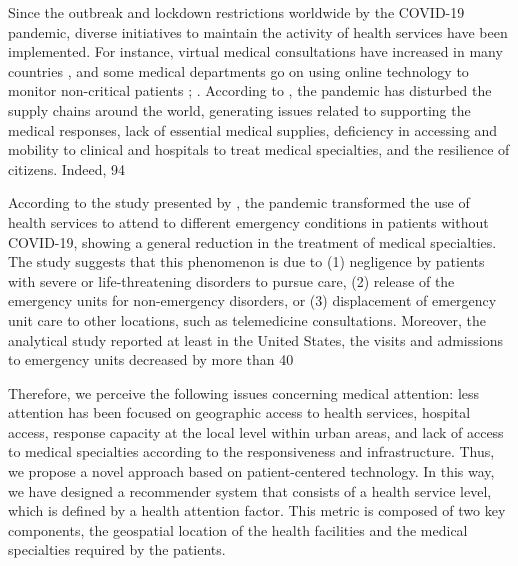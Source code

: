 \documentclass[sustainability,article,submit,pdftex,moreauthors]{Definitions/mdpi}
\begin{document}
Since the outbreak and lockdown restrictions worldwide by the COVID-19 pandemic, diverse initiatives to maintain the activity of health services have been implemented. For instance, virtual medical consultations have increased in many countries \citep{banerjee2020teleconsultation}, and some medical departments go on using online technology to monitor non-critical patients \citep{pinar2021preliminary}; \citep{tamayo2020evaluation}. According to \citep{shahed2021supply}, the pandemic has disturbed the supply chains around the world, generating issues related to supporting the medical responses, lack of essential medical supplies, deficiency in accessing and mobility to clinical and hospitals to treat medical specialties, and the resilience of citizens. Indeed, 94%

According to the study presented by \citep{rosenbaum2020untold}, the pandemic transformed the use of health services to attend to different emergency conditions in patients without COVID-19, showing a general reduction in the treatment of medical specialties. The study suggests that this phenomenon is due to (1) negligence by patients with severe or life-threatening disorders to pursue care, (2) release of the emergency units for non-emergency disorders, or (3) displacement of emergency unit care to other locations, such as telemedicine consultations. Moreover, the analytical study reported at least in the United States, the visits and admissions to emergency units decreased by more than 40%

Therefore, we perceive the following issues concerning medical attention: less attention has been focused on geographic access to health services, hospital access, response capacity at the local level within urban areas, and lack of access to medical specialties according to the responsiveness and infrastructure. Thus, we propose a novel approach based on patient-centered technology. In this way, we have designed a recommender system that consists of a health service level, which is defined by a health attention factor. This metric is composed of two key components, the geospatial location of the health facilities and the medical specialties required by the patients. 
\end{document}
